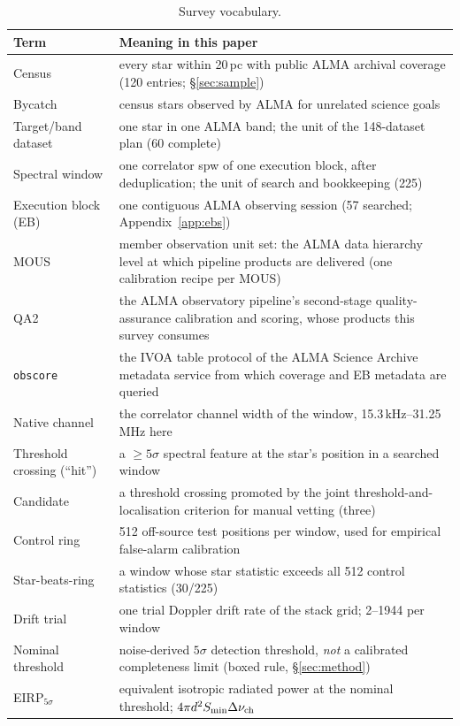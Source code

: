 \documentclass{openjournal}
\begin{document}
\begin{table}
\centering
\small
\caption{Survey vocabulary.}
\label{tab:glossary}
\begin{tabularx}{\textwidth}{@{}lX@{}}
\hline
Term & Meaning in this paper \\
\hline
Census & every star within 20\,pc with public ALMA archival coverage (120 entries; \S\ref{sec:sample}) \\
Bycatch & census stars observed by ALMA for unrelated science goals \\
Target/band dataset & one star in one ALMA band; the unit of the 148-dataset plan (60 complete) \\
Spectral window & one correlator spw of one execution block, after deduplication; the unit of search and bookkeeping (225) \\
Execution block (EB) & one contiguous ALMA observing session (57 searched; Appendix~\ref{app:ebs}) \\
MOUS & member observation unit set: the ALMA data hierarchy level at which pipeline products are delivered (one calibration recipe per MOUS) \\
QA2 & the ALMA observatory pipeline's second-stage quality-assurance calibration and scoring, whose products this survey consumes \\
\texttt{obscore} & the IVOA table protocol of the ALMA Science Archive metadata service from which coverage and EB metadata are queried \\
Native channel & the correlator channel width of the window, 15.3\,kHz--31.25\,MHz here \\
Threshold crossing (``hit'') & a $\geq5\sigma$ spectral feature at the star's position in a searched window \\
Candidate & a threshold crossing promoted by the joint threshold-and-localisation criterion for manual vetting (three) \\
Control ring & 512 off-source test positions per window, used for empirical false-alarm calibration \\
Star-beats-ring & a window whose star statistic exceeds all 512 control statistics (30/225) \\
Drift trial & one trial Doppler drift rate of the stack grid; 2--1944 per window \\
Nominal threshold & noise-derived $5\sigma$ detection threshold, \emph{not} a calibrated completeness limit (boxed rule, \S\ref{sec:method}) \\
EIRP$_{5\sigma}$ & equivalent isotropic radiated power at the nominal threshold; $4\pi d^2 S_{\min}\Delta\nu_{\rm ch}$ \\

\end{tabularx}
\end{table}
\end{document}
